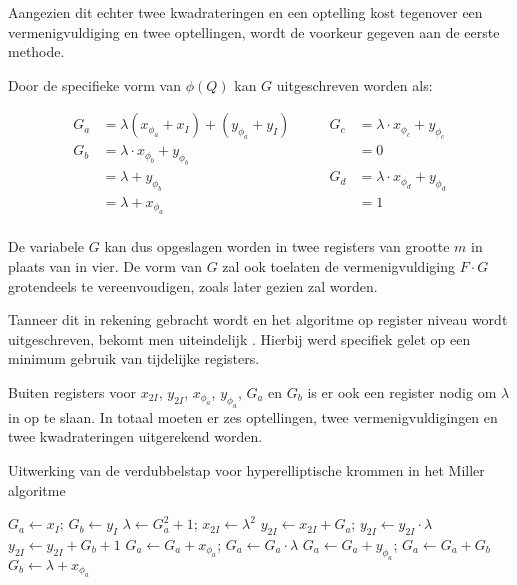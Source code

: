 Aangezien dit echter twee kwadrateringen en een optelling kost tegenover een vermenigvuldiging en twee optellingen, wordt de voorkeur gegeven aan de eerste methode.

Door de specifieke vorm van $\phi(Q)$ kan $G$ uitgeschreven worden als:

\[\begin{aligned}
	G_a	&=	\lambda (x_{\phi_a} + x_I) + (y_{\phi_a} + y_I)\qquad&
				G_c	&= \lambda \cdot x_{\phi_c} + y_{\phi_c}\\
	G_b	&=	\lambda \cdot x_{\phi_b} + y_{\phi_b}&
						&= 0\\
			&= \lambda + y_{\phi_b}&
				G_d	&= \lambda \cdot x_{\phi_d} + y_{\phi_d}\\
			&=	\lambda + x_{\phi_a}&
						&= 1\\
\end{aligned}\]

De variabele $G$ kan dus opgeslagen worden in twee registers van grootte $m$ in plaats van in vier. De vorm van $G$ zal ook toelaten de vermenigvuldiging $F \cdot G$ grotendeels te vereenvoudigen, zoals later gezien zal worden.

Tanneer dit in rekening gebracht wordt en het algoritme op register niveau wordt uitgeschreven, bekomt men uiteindelijk . Hierbij werd specifiek gelet op een minimum gebruik van tijdelijke registers.

Buiten registers voor $x_{2I}$, $y_{2I}$, $x_{\phi_a}$, $y_{\phi_a}$, $G_a$ en $G_b$ is er ook een register nodig om $\lambda$ in op te slaan. In totaal moeten er zes optellingen, twee vermenigvuldigingen en twee kwadrateringen uitgerekend worden.

\begin{algorithm}[h]
	\caption{Uitwerking van de verdubbelstap voor hyperelliptische krommen in het Miller algoritme}
	\label{algoritme-implementatie-miller-double-detail}
	$G_a \leftarrow x_I$; $G_b \leftarrow y_I$\;
	$\lambda \leftarrow G_a^2 + 1$; $x_{2I} \leftarrow \lambda ^2$\;
	$y_{2I} \leftarrow x_{2I} + G_a$; $y_{2I} \leftarrow y_{2I} \cdot \lambda$\;
	$y_{2I} \leftarrow y_{2I} + G_b + 1$\;
	$G_a \leftarrow G_a + x_{\phi_a}$; $G_a \leftarrow G_a \cdot \lambda$\;
	$G_a \leftarrow G_a + y_{\phi_a}$; $G_a \leftarrow G_a + G_b$\;
	$G_b \leftarrow \lambda + x_{\phi_a}$\;
\end{algorithm}


